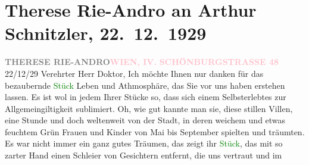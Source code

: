 

               \section[Therese Rie-Andro an Arthur Schnitzler, 22. 12. 1929]{ Therese Rie-Andro an Arthur Schnitzler, 22. 12. 1929}\nopagebreak{}\rehead{ }\normalsize\beginnumbering{} \toendnotes[C]{\smallbreak\pagebreak[2]} 
\toendnotes[C]{\smallbreak}\pstart
           \noindent{}{\pb}\textcolor{gray}{\textbf{THERESE RIE-ANDRO}}\hfill \textcolor{gray}{\textbf{\textcolor{pink}{WIEN, IV.}{}\ledrightnote{\textcolor{pink}{IV., Wieden}}}}\pend
           \pstart
           \raggedleft{}\textcolor{gray}{\textbf{\textcolor{pink}{SCHÖNBURGSTRASSE 48}{}\ledrightnote{\textcolor{pink}{Schönburgstraße}}}}\pend
           \pstart
           \raggedleft{}22/12/29\pend
           \pstart{}Verehrter Herr Doktor,\pend\pstart
           Ich möchte Ihnen nur danken für das bezaubernde \textcolor{green}{Stück}{} Leben und Athmosphäre, das Sie \label{K_L02567-1v}\label{K_L02567-1h} vor uns haben erstehen lassen. Es ist wol in jedem Ihrer Stücke so, dass sich
               einem Selbsterlebtes zur Allgemeingiltigkeit sublimiert. Oh, wie gut kannte man sie,
               diese stillen Villen, eine Stunde und doch weltenweit von der Stadt, in deren weichem
               und etwas feuchtem Grün Frauen und Kinder von Mai bis September spielten und
               träumten. Es war nicht immer ein ganz gutes Träumen, das zeigt ihr \textcolor{green}{Stück}{}, das mit so zarter Hand einen Schleier
               von Gesichtern entfernt, die uns  vertraut und im
